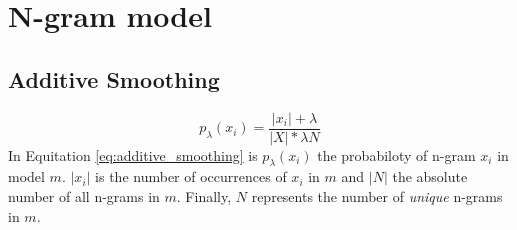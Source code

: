 \documentclass[10pt,a4paper]{article}
\begin{document}
\section{N-gram model}
\subsection{Additive Smoothing}
\begin{equation}
\label{eq:additive_smoothing}
p_{\lambda}(x_i)=\frac{|x_i|+\lambda}{|X|*\lambda N}
\end{equation}
In Equitation \ref{eq:additive_smoothing} is $p_\lambda(x_i)$ the probabiloty of n-gram $x_i$ in model $m$.
$|x_i|$ is the number of occurrences of $x_i$ in $m$ and $|N|$ the absolute number of all n-grams in $m$.
Finally, $N$ represents the number of \emph{unique} n-grams in $m$.
\end{document}
